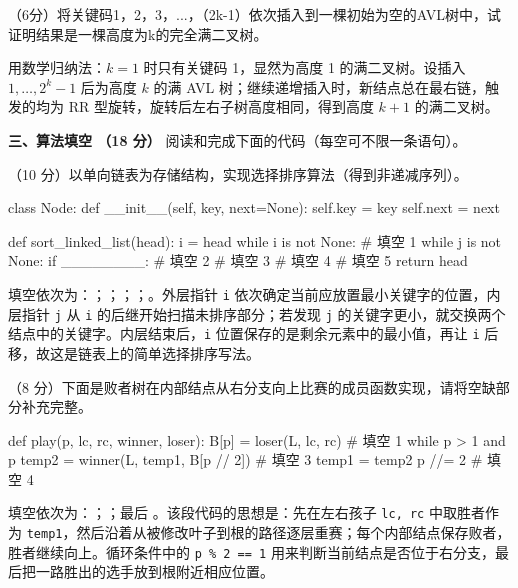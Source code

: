 \begin{question}
（6分）将关键码1，2，3，...，（2k-1）依次插入到一棵初始为空的AVL树中，试证明结果是一棵高度为k的完全满二叉树。
\begin{solution}
用数学归纳法：$k=1$ 时只有关键码 1，显然为高度 1 的满二叉树。设插入 $1,\ldots,2^k-1$ 后为高度 $k$ 的满 AVL 树；继续递增插入时，新结点总在最右链，触发的均为 RR 型旋转，旋转后左右子树高度相同，得到高度 $k+1$ 的满二叉树。
\end{solution}
\end{question}

\textbf{三、算法填空 （18 分）}
阅读和完成下面的代码（每空可不限一条语句）。
\begin{question}
（10 分）以单向链表为存储结构，实现选择排序算法（得到非递减序列）。
\begin{pycode}
class Node:
    def __init__(self, key, next=None):
        self.key = key
        self.next = next


def sort_linked_list(head):
    i = head
    while i is not None:
        # 填空 1
        while j is not None:
            if ________:        # 填空 2
                # 填空 3
            # 填空 4
        # 填空 5
    return head
\end{pycode}
\begin{solution}
填空依次为：\texttt{}；\texttt{}；\texttt{}；\texttt{}；\texttt{}。外层指针 \texttt{i} 依次确定当前应放置最小关键字的位置，内层指针 \texttt{j} 从 \texttt{i} 的后继开始扫描未排序部分；若发现 \texttt{j} 的关键字更小，就交换两个结点中的关键字。内层结束后，\texttt{i} 位置保存的是剩余元素中的最小值，再让 \texttt{i} 后移，故这是链表上的简单选择排序写法。
\end{solution}
\end{question}

\begin{question}
（8 分）下面是败者树在内部结点从右分支向上比赛的成员函数实现，请将空缺部分补充完整。
\begin{pycode}
def play(p, lc, rc, winner, loser):
    B[p] = loser(L, lc, rc)
    # 填空 1
    while p > 1 and p %
        temp2 = winner(L, temp1, B[p // 2])
        # 填空 3
        temp1 = temp2
        p //= 2
    # 填空 4
\end{pycode}
\begin{solution}
填空依次为：\texttt{}；\texttt{}；最后 \texttt{}。该段代码的思想是：先在左右孩子 \texttt{lc, rc} 中取胜者作为 \texttt{temp1}，然后沿着从被修改叶子到根的路径逐层重赛；每个内部结点保存败者，胜者继续向上。循环条件中的 \texttt{p \% 2 == 1} 用来判断当前结点是否位于右分支，最后把一路胜出的选手放到根附近相应位置。
\end{solution}
\end{question}

